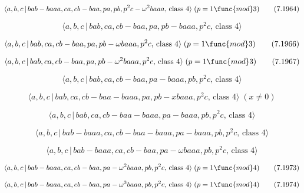 \documentclass[10pt]{article}
\begin{document}
\begin{equation}
\langle a,b,c\,|\,bab-baaa,ca,cb-baa,pa,pb,p^{2}c-\omega ^{2}baaa,\,\text{%
class }4\rangle \;(p=1\func{mod}3)  \tag{7.1964}
\end{equation}

\begin{equation}
\langle a,b,c\,|\,bab,ca,cb-baa,pa,pb-baaa,p^2c,\,\text{class }4\rangle 
\tag{7.1965}
\end{equation}

\begin{equation}
\langle a,b,c\,|\,bab,ca,cb-baa,pa,pb-\omega baaa,p^{2}c,\,\text{class }%
4\rangle \;(p=1\func{mod}3)  \tag{7.1966}
\end{equation}

\begin{equation}
\langle a,b,c\,|\,bab,ca,cb-baa,pa,pb-\omega ^{2}baaa,p^{2}c,\,\text{class }%
4\rangle \;(p=1\func{mod}3)  \tag{7.1967}
\end{equation}

\begin{equation}
\langle a,b,c\,|\,bab,ca,cb-baa,pa-baaa,pb,p^2c,\,\text{class }4\rangle 
\tag{7.1968}
\end{equation}

\begin{equation}
\langle a,b,c\,|\,bab,ca,cb-baa-baaa,pa,pb-xbaaa,p^2c,\,\text{class }%
4\rangle \;(x \neq 0)  \tag{7.1969}
\end{equation}

\begin{equation}
\langle a,b,c\,|\,bab,ca,cb-baa-baaa,pa-baaa,pb,p^2c,\,\text{class }4\rangle
\tag{7.1970}
\end{equation}

\begin{equation}
\langle a,b,c\,|\,bab-baaa,ca,cb-baa-baaa,pa-baaa,pb,p^2c,\,\text{class }%
4\rangle  \tag{7.1971}
\end{equation}

\begin{equation}
\langle a,b,c\,|\,bab-baaa,ca,cb-baa,pa-\omega baaa,pb,p^{2}c,\,\text{class }%
4\rangle  \tag{7.1972}
\end{equation}

\begin{equation}
\langle a,b,c\,|\,bab-baaa,ca,cb-baa,pa-\omega ^{2}baaa,pb,p^{2}c,\,\text{%
class }4\rangle \;(p=1\func{mod}4)  \tag{7.1973}
\end{equation}

\begin{equation}
\langle a,b,c\,|\,bab-baaa,ca,cb-baa,pa-\omega ^{3}baaa,pb,p^{2}c,\,\text{%
class }4\rangle \;(p=1\func{mod}4)  \tag{7.1974}
\end{equation}
\end{document}
